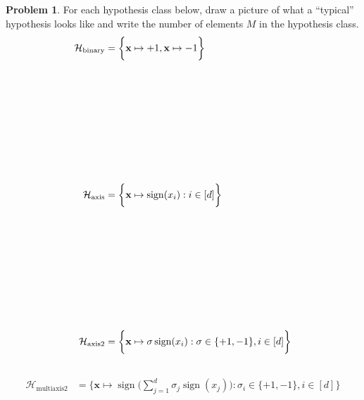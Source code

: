 \documentclass[10pt]{exam}
\theoremstyle{definition}
\newtheorem{problem}{Problem}
\DeclareMathOperator{\sign}{sign}
\newcommand{\x}{\mathbf x}
\newcommand{\HH}[1]{\mathcal H_{\text{#1}}}
\begin{document}
\begin{problem}
    For each hypothesis class below, draw a picture of what a ``typical'' hypothesis looks like and write the number of elements $M$ in the hypothesis class.
\begin{align*}
    \HH{binary} &= \bigg\{ \x \mapsto +1, \x \mapsto -1 \bigg\}\\
    \vspace{3in}
    \\ \\ \\ \\ \\ \\ \\ \\
    \HH{axis} &= \bigg\{ \x \mapsto \sign(x_i) : i \in [d] \bigg\} \\
    \vspace{3in}
    \\ \\ \\ \\ \\ \\ \\ \\
    \HH{axis2} &= \bigg\{ \x \mapsto \sigma\sign(x_i) : \sigma \in\{+1, -1\}, i \in [d] \bigg\} \\
    \vspace{3in}
\end{align*}
    \begin{align*}
    \HH{multiaxis2} &= \bigg\{ \x \mapsto \sign\bigg(\sum_{j=1}^d \sigma_j \sign(x_j) \bigg) : \sigma_i \in \{+1, -1\}, i \in [d] \bigg\}  \\
    \\ \\ \\ \\ \\ \\ \\ \\
    \\ \\ \\ \\ \\ \\ \\ \\

\end{align*}
\end{problem}
\end{document}
